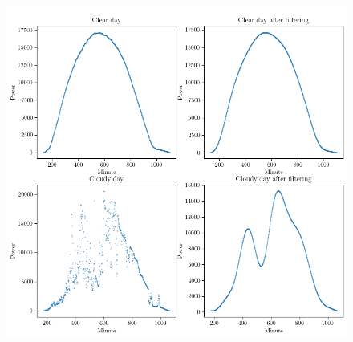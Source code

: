 \begin{figure}[h]
\centering
\includegraphics[width=0.8\linewidth]{pics/cloudfree_algo}
\label{fig_cloudfree_algo}
\end{figure}



\newpage










